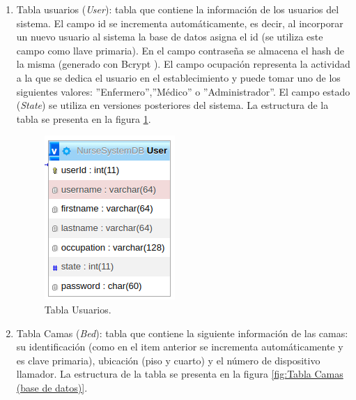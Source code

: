 \begin{enumerate}

\item Tabla usuarios (\textit{User}): tabla que contiene la información de los usuarios del sistema. El campo id se incrementa automáticamente, es decir, al incorporar un nuevo usuario al sistema la base de datos asigna el id (se utiliza este campo como llave primaria). En el campo contraseña se almacena el hash de la misma (generado con Bcrypt \citep{WEBSITE:31}). El campo ocupación representa la actividad a la que se dedica el usuario en el establecimiento y puede tomar uno de los siguientes valores: ''Enfermero'',''Médico'' o ''Administrador''. El campo estado (\textit{State}) se utiliza en versiones posteriores del sistema. La estructura de la tabla se presenta en la figura \ref{fig:Tabla Usuarios (base de datos)}.

\begin{figure}[ht]
	\centering
	\includegraphics[scale=.70]{./Figures/dB(user).png}
	\caption{Tabla Usuarios.}
	\label{fig:Tabla Usuarios (base de datos)}
\end{figure}

\item Tabla Camas (\textit{Bed}): tabla que contiene la siguiente información de las camas: su identificación (como en el item anterior se incrementa automáticamente y es clave primaria), ubicación (piso y cuarto) y el número de dispositivo llamador. La estructura de la tabla se presenta en la figura \ref{fig:Tabla Camas (base de datos)}.


\end{enumerate}
